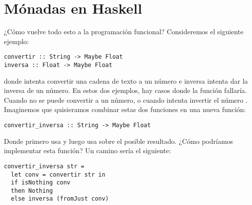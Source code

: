 \section{Mónadas en Haskell}
¿Cómo vuelve todo esto a la programación funcional?
Consideremos el siguiente ejemplo:
\begin{verbatim}
convertir :: String -> Maybe Float
inversa :: Float -> Maybe Float
\end{verbatim}
donde  intenta convertir una cadena de texto a un número e inversa intenta dar la inversa de un número.
En estos dos ejemplos, hay casos donde la función fallaría.
Cuando  no se puede convertir a un número, o cuando  intenta invertir el número .
Imaginemos que quisieramos combinar estas dos funciones en una nueva función:
\begin{verbatim}
convertir_inversa :: String -> Maybe Float
\end{verbatim}
Donde  primero usa  y luego usa  sobre el posible resultado.
¿Cómo podríamos implementar esta función?
Un camino sería el siguiente:
\begin{verbatim}
convertir_inversa str =
  let conv = convertir str in
  if isNothing conv
  then Nothing
  else inversa (fromJust conv)
\end{verbatim}

